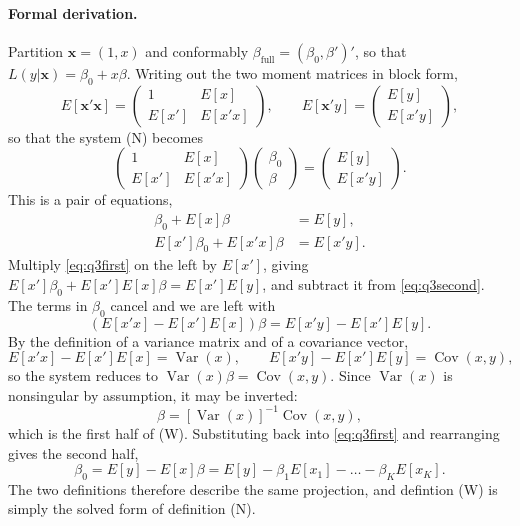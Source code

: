 \documentclass[11pt]{article}
\DeclareMathOperator{\Var}{Var}
\DeclareMathOperator{\Cov}{Cov}
\begin{document}
\paragraph{Formal derivation.}
Partition $\mathbf{x} = (1,x)$ and conformably $\beta_{\text{full}} =
(\beta_0, \beta')'$, so that $L(y|\mathbf{x}) = \beta_0 + x\beta$. Writing out
the two moment matrices in block form,
\[
E[\mathbf{x}'\mathbf{x}] =
\begin{pmatrix}
1 & E[x]\\
E[x'] & E[x'x]
\end{pmatrix},
\qquad
E[\mathbf{x}'y] =
\begin{pmatrix}
E[y]\\
E[x'y]
\end{pmatrix},
\]
so that the system (N) becomes
\[
\begin{pmatrix}
1 & E[x]\\
E[x'] & E[x'x]
\end{pmatrix}
\begin{pmatrix}
\beta_0\\ \beta
\end{pmatrix}
=
\begin{pmatrix}
E[y]\\ E[x'y]
\end{pmatrix}.
\]
This is a pair of equations,
\begin{align}
\beta_0 + E[x]\beta &= E[y], \label{eq:q3first}\\
E[x']\beta_0 + E[x'x]\beta &= E[x'y]. \label{eq:q3second}
\end{align}
Multiply \eqref{eq:q3first} on the left by $E[x']$, giving
$E[x']\beta_0 + E[x']E[x]\beta = E[x']E[y]$, and subtract it from
\eqref{eq:q3second}. The terms in $\beta_0$ cancel and we are left with
\[
\left(E[x'x] - E[x']E[x]\right)\beta = E[x'y] - E[x']E[y].
\]
By the definition of a variance matrix and of
a covariance vector,
\[
E[x'x] - E[x']E[x] = \Var(x),
\qquad
E[x'y] - E[x']E[y] = \Cov(x,y),
\]
so the system reduces to $\Var(x)\beta = \Cov(x,y)$. Since $\Var(x)$ is
nonsingular by assumption, it may be inverted:
\[
\beta = \left[\Var(x)\right]^{-1}\Cov(x,y),
\]
which is the first half of (W). Substituting back into \eqref{eq:q3first} and
rearranging gives the second half,
\[
\beta_0 = E[y] - E[x]\beta
= E[y] - \beta_1E[x_1] - \dots - \beta_KE[x_K].
\]
The two definitions therefore describe the same projection, and defintion (W) is simply
the solved form of definition (N).

\end{document}
